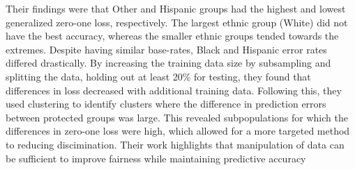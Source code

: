 \documentclass[12pt]{article}
\begin{document}
Their findings were that Other and Hispanic groups had the highest and lowest generalized zero-one loss, respectively. The largest ethnic group (White) did not have the best accuracy, whereas the smaller ethnic groups tended towards the extremes. Despite having similar base-rates, Black and Hispanic error rates differed drastically. By increasing the training data size by subsampling and splitting the data, holding out at least 20\% for testing, they found that differences in loss decreased with additional training data. Following this, they used clustering to identify clusters where the difference in prediction errors between protected groups was large. This revealed subpopulations for which the differences in zero-one loss were high, which allowed for a more targeted method to reducing discimination. Their work highlights that manipulation of data can be sufficient to improve fairness while maintaining predictive accuracy \cite{Chen_2018}

\newpage


\end{document}
